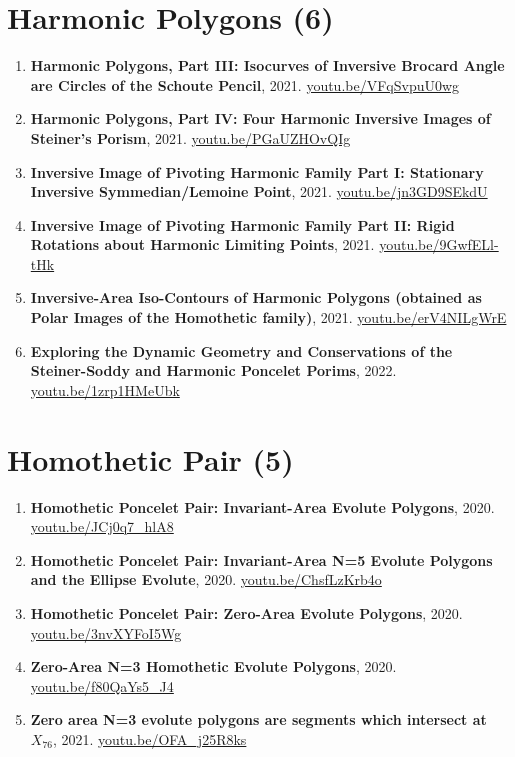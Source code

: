 \documentclass[12pt]{article}
\begin{document}
\section{Harmonic Polygons (6)}

\begin{enumerate}[resume]
\item \textbf{Harmonic Polygons, Part III: Isocurves of Inversive Brocard Angle are Circles of the Schoute Pencil}, 2021. \href{https://youtu.be/VFqSvpuU0wg}{\url{youtu.be/VFqSvpuU0wg}}
\item \textbf{Harmonic Polygons, Part IV: Four Harmonic Inversive Images of Steiner's Porism}, 2021. \href{https://youtu.be/PGaUZHOvQIg}{\url{youtu.be/PGaUZHOvQIg}}
\item \textbf{Inversive Image of Pivoting Harmonic Family Part I: Stationary Inversive Symmedian/Lemoine Point}, 2021. \href{https://youtu.be/jn3GD9SEkdU}{\url{youtu.be/jn3GD9SEkdU}}
\item \textbf{Inversive Image of Pivoting Harmonic Family Part II: Rigid Rotations about Harmonic Limiting Points}, 2021. \href{https://youtu.be/9GwfELl-tHk}{\url{youtu.be/9GwfELl-tHk}}
\item \textbf{Inversive-Area Iso-Contours of Harmonic Polygons (obtained as Polar Images of the Homothetic family)}, 2021. \href{https://youtu.be/erV4NILgWrE}{\url{youtu.be/erV4NILgWrE}}
\item \textbf{Exploring the Dynamic Geometry and Conservations of the Steiner-Soddy and Harmonic Poncelet Porims}, 2022. \href{https://youtu.be/1zrp1HMeUbk}{\url{youtu.be/1zrp1HMeUbk}}
\end{enumerate}

\section{Homothetic Pair (5)}

\begin{enumerate}[resume]
\item \textbf{Homothetic Poncelet Pair: Invariant-Area Evolute Polygons}, 2020. \href{https://youtu.be/JCj0q7_hlA8}{\url{youtu.be/JCj0q7\_hlA8}}
\item \textbf{Homothetic Poncelet Pair: Invariant-Area N=5 Evolute Polygons and the Ellipse Evolute}, 2020. \href{https://youtu.be/ChsfLzKrb4o}{\url{youtu.be/ChsfLzKrb4o}}
\item \textbf{Homothetic Poncelet Pair: Zero-Area Evolute Polygons}, 2020. \href{https://youtu.be/3nvXYFoI5Wg}{\url{youtu.be/3nvXYFoI5Wg}}
\item \textbf{Zero-Area N=3 Homothetic Evolute Polygons}, 2020. \href{https://youtu.be/f80QaYs5_J4}{\url{youtu.be/f80QaYs5\_J4}}
\item \textbf{Zero area N=3 evolute polygons are segments which intersect at $X_{76}$}, 2021. \href{https://youtu.be/OFA_j25R8ks}{\url{youtu.be/OFA\_j25R8ks}}
\end{enumerate}
\end{document}
